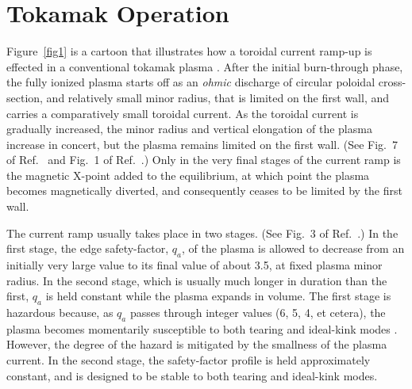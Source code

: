\documentclass{iopjournal}
\providecommand{\DIFaddbegin}{} %
\providecommand{\DIFaddend}{} %
\newcommand{\DIFaddincludegraphics}[2][]{{\color{blue}\fbox{\DIFOincludegraphics[#1]{#2}}}} %
\DeclareRobustCommand{\DIFaddbegin}{\DIFOaddbegin \let\includegraphics\DIFaddincludegraphics} %
\DeclareRobustCommand{\DIFaddend}{\DIFOaddend \let\includegraphics\DIFOincludegraphics} %
\begin{document}
\section{Tokamak Operation}\DIFaddbegin \label{operation}
\DIFaddend Figure~\ref{fig1} is a cartoon that illustrates how a toroidal current ramp-up is effected in a conventional tokamak plasma \cite{lister,federici, jackson,politzer}.
After the initial burn-through phase, the fully ionized plasma starts off as an {\em ohmic}\/  discharge of circular poloidal cross-section, and relatively
small minor radius, that is limited on the first wall, and carries a comparatively small toroidal current. As the toroidal current is
gradually increased, the minor radius and vertical elongation of the plasma increase in concert, but the plasma remains limited on
the first wall. (See Fig.~7 of Ref.~\cite{lister} and Fig.~1 of Ref.~\cite{federici}.) Only in the very final stages of the current ramp is the magnetic X-point added to the equilibrium, at which point the
plasma becomes magnetically diverted, and consequently ceases to be limited by the first wall. 

The current ramp usually takes place in two stages.  (See Fig.~3 of Ref.~\cite{creely}.) In the first stage, the edge safety-factor, $q_a$, of the  plasma is allowed to decrease from
an initially very large value to its final value of about 3.5, at fixed plasma minor radius. In the second stage, which is usually much longer in duration than the first, $q_a$ is held constant
while the plasma expands in volume. The first stage is hazardous because, as $q_a$ passes through integer values (6, 5, 4, et cetera), the plasma becomes
momentarily susceptible  to both tearing and ideal-kink modes \cite{wesson,granetz1,cheng}. However, the degree of the hazard is mitigated by the smallness of the plasma current.
In the second stage, the safety-factor profile is  held approximately constant, and is designed to be stable to both tearing and ideal-kink modes. 
\end{document}
